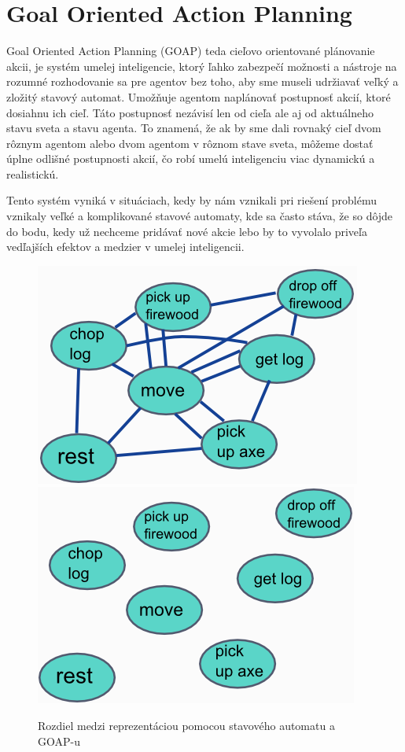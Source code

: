 \section{Goal Oriented Action Planning}
Goal Oriented Action Planning (GOAP) teda cieľovo orientované plánovanie akcii, je systém umelej inteligencie, ktorý ľahko zabezpečí možnosti a nástroje na rozumné rozhodovanie sa pre agentov bez toho, aby sme museli udržiavať veľký a zložitý stavový automat. Umožňuje agentom naplánovať postupnosť akcií, ktoré dosiahnu ich cieľ. Táto postupnosť nezávisí len od cieľa ale aj od aktuálneho stavu sveta a stavu agenta. To znamená, že ak by sme dali rovnaký cieľ dvom rôznym agentom alebo dvom agentom v rôznom stave sveta, môžeme dostať úplne odlišné postupnosti akcií, čo robí umelú inteligenciu viac dynamickú a realistickú.\par
Tento systém vyniká v situáciach, kedy by nám vznikali pri riešení problému vznikaly veľké a komplikované stavové automaty, kde sa často stáva, že so dôjde do bodu, kedy už nechceme pridávať nové akcie lebo by to vyvolalo priveľa vedľajších efektov a medzier v umelej inteligencii.
\begin{figure}[H] 
\begin{center}
\includegraphics[scale=0.65]{img/fsm_states.png} \hspace{0.5cm}
\includegraphics[scale=0.65]{img/goap_states.png}
\caption{Rozdiel medzi reprezentáciou pomocou stavového automatu a GOAP-u}
\label{fig:ch22}
\end{center}
\end{figure}
